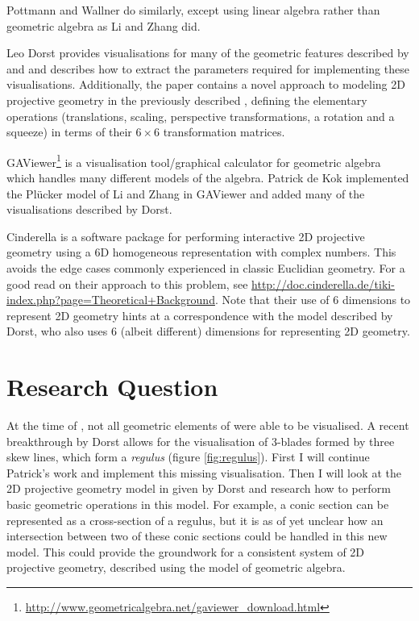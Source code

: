 \documentclass[a4paper, 10pt]{article}
\begin{document}
Pottmann and Wallner\cite{pottmann2001computational} do similarly, except using
linear algebra rather than geometric algebra as Li and Zhang did.

Leo Dorst\cite{dorst2013versors} provides visualisations for many of the
geometric features described by \cite{hangbo2011} and
\cite{pottmann2001computational} and describes how to extract the parameters
required for implementing these visualisations. Additionally, the paper contains
a novel approach to modeling 2D projective geometry in the previously described
\rp, defining the elementary operations (translations, scaling, perspective
transformations, a rotation and a squeeze) in terms of their $6 \times 6$
transformation matrices.

GAViewer\footnote{\url{http://www.geometricalgebra.net/gaviewer\_download.html}}
is a visualisation tool/graphical calculator for geometric algebra which handles
many different models of the algebra. Patrick de Kok\cite{dekok2012} implemented
the Pl\"{u}cker model of Li and Zhang in GAViewer and added many of the
visualisations described by Dorst.

Cinderella\cite{richter1999interactive} is a software package for performing
interactive 2D projective geometry using a 6D homogeneous representation with
complex numbers. This avoids the edge cases commonly experienced in classic
Euclidian geometry. For a good read on their approach to this problem, see
\url{http://doc.cinderella.de/tiki-index.php?page=Theoretical+Background}.
Note that their use of 6 dimensions to represent 2D geometry hints at a
correspondence with the model described by Dorst, who also uses 6 (albeit
different) dimensions for representing 2D geometry.

\section{Research Question}
At the time of \cite{dekok2012}, not all geometric elements of \rp were able to
be visualised. A recent breakthrough by Dorst allows for the visualisation of
3-blades formed by three skew lines, which form a \emph{regulus} (figure
\ref{fig:regulus}). First I will continue Patrick's work and implement this
missing visualisation. Then I will look at the 2D projective geometry model in
\rp given by Dorst and research how to perform basic geometric operations in
this model. For example, a conic section can be represented as a cross-section
of a regulus, but it is as of yet unclear how an intersection between two of
these conic sections could be handled in this new model. This could provide the
groundwork for a consistent system of 2D projective geometry, described using
the \rp model of geometric algebra.
\end{document}
